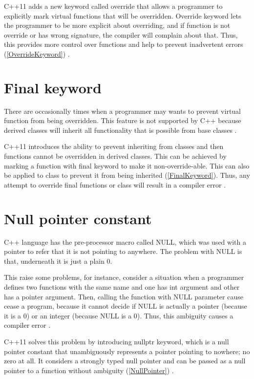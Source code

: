 \documentclass[11pt]{report}
\begin{document}
C++11 adds a new keyword called override that allows a programmer to explicitly mark virtual functions that will be overridden. Override keyword lets the programmer to be more explicit about overriding, and if function is not override or has wrong signature, the compiler will complain about that. Thus, this provides more control over functions and help to prevent inadvertent errors (\ref{OverrideKeyword}) \cite{Gregorie:professionalcpp}.

\section{Final keyword}
\label{section: Final keyword}
There are occasionally times when a programmer may wants to prevent virtual function from being overridden. This feature is not supported by C++ because derived classes will inherit all functionality that is possible from base classes \cite{Stroustrup:2012:Cpp11}.


C++11 introduces the ability to prevent inheriting from classes and then functions cannot be overridden in derived classes. This can be achieved by marking a function with final keyword to make it non-override-able. This can also be applied to class to prevent it from being inherited (\ref{FinalKeyword}).  Thus, any attempt to override final functions or class will result in a compiler error  \cite{Gregorie:professionalcpp}.

\section{Null pointer constant}
\label{section: Null pointer constant}
C++ language has the pre-processor macro called NULL, which was used with a pointer to refer that it is not pointing to anywhere. The problem with NULL is that, underneath it is just a plain 0. 

This raise some problems, for instance, consider a situation when a programmer defines two functions with the same name and one has int argument and other has a pointer argument. Then, calling the function with NULL parameter cause cease a program, because it cannot decide if NULL is actually a pointer (because it is a 0) or an integer (because NULL is a 0). Thus, this ambiguity causes a compiler error \cite{Cppreference:2012:Cpp11}.


C++11 solves this problem by introducing nullptr keyword, which is a null pointer constant that unambiguously represents a pointer pointing to nowhere; no zero at all. It considers a strongly typed null pointer and can be passed as a null pointer to a function without ambiguity (\ref{NullPointer}) \cite{Cppreference:2012:Cpp11}. 
\end{document}
